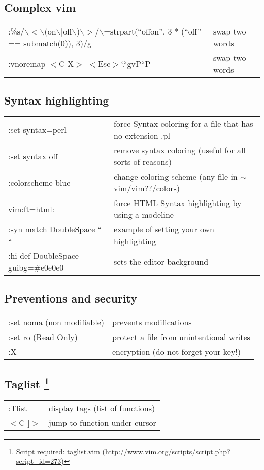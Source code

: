\documentclass[10pt]{article}
\begin{document}
\subsection*{Complex vim}
\begin{center}
\begin{longtable}{l|l}
:\%s/$\backslash$$<$$\backslash$(on$\backslash$$|$off$\backslash$)$\backslash$$>$/$\backslash$=strpart(``offon'', 3 * (``off'' == submatch(0)), 3)/g & swap two words\\
:vnoremap $<$C-X$>$ $<$Esc$>$`.``gvP``P & swap two words
\end{longtable}
\end{center}

\subsection*{Syntax highlighting}
\begin{center}
\begin{longtable}{l|l}
 :set syntax=perl & force Syntax coloring for a file that has no extension .pl\\
 :set syntax off & remove syntax coloring (useful for all sorts of reasons)\\
 :colorscheme blue & change coloring scheme (any file in $\sim$vim/vim??/colors)\\
 vim:ft=html: & force HTML Syntax highlighting by using a modeline\\
 :syn match DoubleSpace `` `` & example of setting your own highlighting\\
 :hi def DoubleSpace guibg=\#e0e0e0 & sets the editor background
\end{longtable}
\end{center}

\subsection*{Preventions and security}
\begin{center}
\begin{longtable}{l|l}
 :set noma (non modifiable) & prevents modifications\\
 :set ro (Read Only) & protect a file from unintentional writes\\
 :X & encryption (do not forget your key!)
\end{longtable}
\end{center}

\subsection*{Taglist \footnote{Script required: taglist.vim (\url{http://www.vim.org/scripts/script.php?script_id=273)}}}
\begin{center}
\begin{longtable}{l|l}
:Tlist & display tags (list of functions)\\
$<$C-]$>$  & jump to function under cursor
\end{longtable}
\end{center}
\end{document}
